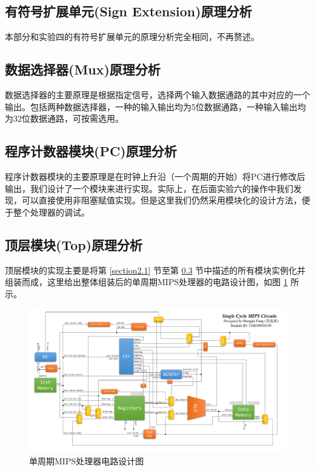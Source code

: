 \documentclass{cumcm}
\numberwithin{equation}{section}
\numberwithin{equation}{subsection}
\begin{document}
\subsection{有符号扩展单元(Sign Extension)原理分析}\label{section2.7}

本部分和实验四的有符号扩展单元的原理分析完全相同，不再赘述。

\subsection{数据选择器(Mux)原理分析}\label{section2.8}

数据选择器的主要原理是根据指定信号，选择两个输入数据通路的其中对应的一个输出。包括两种数据选择器，一种的输入输出均为5位数据通路，一种输入输出均为32位数据通路，可按需选用。

\subsection{程序计数器模块(PC)原理分析}\label{section2.9}

程序计数器模块的主要原理是在时钟上升沿（一个周期的开始）将PC进行修改后输出，我们设计了一个模块来进行实现。实际上，在后面实验六的操作中我们发现，可以直接使用非阻塞赋值实现。但是这里我们仍然采用模块化的设计方法，便于整个处理器的调试。

\subsection{顶层模块(Top)原理分析}\label{section2.10}
顶层模块的实现主要是将第 \ref{section2.1} 节至第 \ref{section2.9} 节中描述的所有模块实例化并组装而成，这里给出整体组装后的单周期MIPS处理器的电路设计图，如图 \ref{fig1} 所示。

\begin{figure}[htbp]
    \centering
    \includegraphics[width=7in]{Design.pdf}
    \caption{单周期MIPS处理器电路设计图}
    \label{fig1}
\end{figure}
\end{document}
